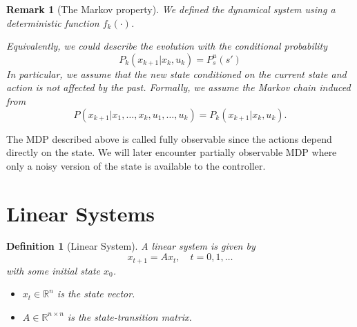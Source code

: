 \documentclass[a4 paper]{article}
\numberwithin{equation}{section}
\theoremstyle{boldStyle}
\newtheorem{remark}{Remark}[section]
\theoremstyle{boldBlueStyle}
\theoremstyle{boldPurpleStyle}
\theoremstyle{boldRedStyle}
\newtheorem{definition}{Definition}[section]
\theoremstyle{boldGreenStyle}
\begin{document}
\begin{remark}[The Markov property]
  We defined the dynamical system using a deterministic function \( f_k(\cdot) \). 

  Equivalently, we could describe the evolution with the conditional probability
  \begin{equation}
    P_k(x_{k+1} | x_k, u_k) = P_s^{u}(s')
  \end{equation}
  In particular, we assume that the new state conditioned on the current state and action is not affected by the past. Formally, we assume the Markov chain induced from
  \begin{equation}
    P(x_{k+1} | x_1, \ldots, x_k, u_1, \ldots, u_k) = P_k(x_{k+1} | x_k, u_k).
  \end{equation}
\end{remark}

The MDP described above is called fully observable since the actions depend directly on the state. We will later encounter partially observable MDP where only a noisy version of the state is available to the controller.




\newpage
\section{Linear Systems}

\begin{definition}[Linear System]
  A linear system is given by
  \begin{equation}
      x_{t+1} = A x_t, \quad t = 0, 1, \ldots
  \end{equation}
  with some initial state \( x_0 \).

  \begin{itemize}
      \item \( x_t \in \mathbb{R}^n \) is the state vector.
      \item \( A \in \mathbb{R}^{n \times n} \) is the state-transition matrix.
  \end{itemize}
\end{definition}
\end{document}

